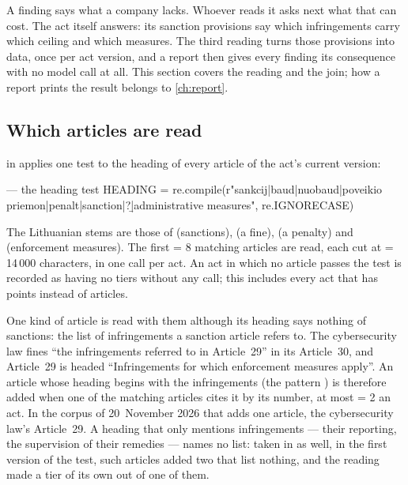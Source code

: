 A finding says what a company lacks. Whoever reads it asks next what that can cost. The act
itself answers: its sanction provisions say which infringements carry which ceiling and
which measures. The third reading turns those provisions into data, once per act version,
and a report then gives every finding its consequence with no model call at all. This
section covers the reading and the join; how a report prints the result belongs to
\cref{ch:report}.

\subsection{Which articles are read}

 in  applies one test to the heading of
every article of the act's current version:

\begin{codefile}{ --- the heading test}
HEADING = re.compile(r"sankcij|baud|nuobaud|poveikio priemon|penalt|sanction|\bfines?\b|administrative measures",
                     re.IGNORECASE)
\end{codefile}

The Lithuanian stems are those of  (sanctions),  (a fine),
 (a penalty) and  (enforcement measures). The first
 = 8 matching articles are read, each cut at  = 14\,000
characters, in one call per act. An act in which no article passes the test is recorded as
having no tiers without any call; this includes every act that has points instead of
articles.

One kind of article is read with them although its heading says nothing of sanctions: the
list of infringements a sanction article refers to. The cybersecurity law fines
\enquote{the infringements referred to in Article~29} in its Article~30, and Article~29 is
headed \enquote{Infringements for which enforcement measures apply}. An article whose
heading begins with the infringements (the pattern ) is therefore added when one
of the matching articles cites it by its number, at most  = 2 an act. In
the corpus of 20~November 2026 that adds one article, the cybersecurity law's Article~29.
A heading that only mentions infringements --- their reporting, the supervision of their
remedies --- names no list: taken in as well, in the first version of the test, such
articles added two that list nothing, and the reading made a tier of its own out of one of
them.

